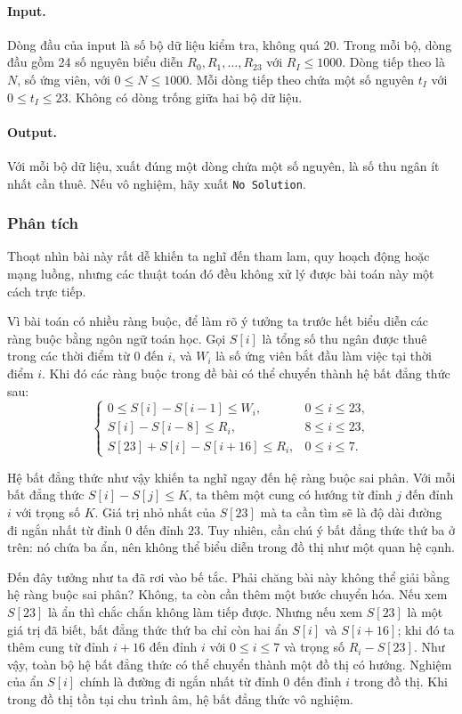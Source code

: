 \documentclass[11pt]{article}
\begin{document}
\paragraph{Input.}
Dòng đầu của input là số bộ dữ liệu kiểm tra, không quá $20$. Trong mỗi bộ,
dòng đầu gồm 24 số nguyên biểu diễn $R_0,R_1,\ldots,R_{23}$ với $R_I\le
1000$. Dòng tiếp theo là $N$, số ứng viên, với $0\le N\le 1000$. Mỗi dòng
tiếp theo chứa một số nguyên $t_I$ với $0\le t_I\le 23$. Không có dòng trống
giữa hai bộ dữ liệu.

\paragraph{Output.}
Với mỗi bộ dữ liệu, xuất đúng một dòng chứa một số nguyên, là số thu ngân ít
nhất cần thuê. Nếu vô nghiệm, hãy xuất \texttt{No Solution}.

\subsubsection*{Phân tích}

Thoạt nhìn bài này rất dễ khiến ta nghĩ đến tham lam, quy hoạch động hoặc
mạng luồng, nhưng các thuật toán đó đều không xử lý được bài toán này một
cách trực tiếp.

Vì bài toán có nhiều ràng buộc, để làm rõ ý tưởng ta trước hết biểu diễn các
ràng buộc bằng ngôn ngữ toán học. Gọi $S[i]$ là tổng số thu ngân được thuê
trong các thời điểm từ $0$ đến $i$, và $W_i$ là số ứng viên bắt đầu làm việc
tại thời điểm $i$. Khi đó các ràng buộc trong đề bài có thể chuyển thành hệ
bất đẳng thức sau:
\[
\begin{cases}
0\le S[i]-S[i-1]\le W_i, & 0\le i\le 23,\\
S[i]-S[i-8]\le R_i, & 8\le i\le 23,\\
S[23]+S[i]-S[i+16]\le R_i, & 0\le i\le 7.
\end{cases}
\]

Hệ bất đẳng thức như vậy khiến ta nghĩ ngay đến hệ ràng buộc sai phân. Với
mỗi bất đẳng thức $S[i]-S[j]\le K$, ta thêm một cung có hướng từ đỉnh $j$ đến
đỉnh $i$ với trọng số $K$. Giá trị nhỏ nhất của $S[23]$ mà ta cần tìm sẽ là
độ dài đường đi ngắn nhất từ đỉnh $0$ đến đỉnh $23$. Tuy nhiên, cần chú ý bất
đẳng thức thứ ba ở trên: nó chứa ba ẩn, nên không thể biểu diễn trong đồ thị
như một quan hệ cạnh.

Đến đây tưởng như ta đã rơi vào bế tắc. Phải chăng bài này không thể giải
bằng hệ ràng buộc sai phân? Không, ta còn cần thêm một bước chuyển hóa. Nếu
xem $S[23]$ là ẩn thì chắc chắn không làm tiếp được. Nhưng nếu xem $S[23]$ là
một giá trị đã biết, bất đẳng thức thứ ba chỉ còn hai ẩn $S[i]$ và $S[i+16]$;
khi đó ta thêm cung từ đỉnh $i+16$ đến đỉnh $i$ với $0\le i\le 7$ và trọng số
$R_i-S[23]$. Như vậy, toàn bộ hệ bất đẳng thức có thể chuyển thành một đồ thị
có hướng. Nghiệm của ẩn $S[i]$ chính là đường đi ngắn nhất từ đỉnh $0$ đến
đỉnh $i$ trong đồ thị. Khi trong đồ thị tồn tại chu trình âm, hệ bất đẳng thức
vô nghiệm.
\end{document}
